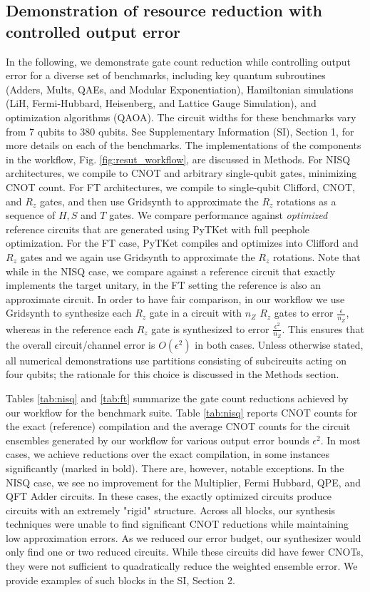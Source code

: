 \subsection*{Demonstration of resource reduction with controlled output error}
\label{sec:demos}
In the following, we demonstrate gate count reduction while controlling output error for a diverse set of benchmarks, including key quantum subroutines (Adders, Mults, QAEs, and Modular Exponentiation), Hamiltonian simulations (LiH, Fermi-Hubbard, Heisenberg, and Lattice Gauge Simulation), and optimization algorithms (QAOA). The circuit widths for these benchmarks vary from 7 qubits to 380 qubits. See Supplementary Information (SI), Section 1, for more details on each of the benchmarks. The implementations of the components in the workflow, Fig. \ref{fig:resut_workflow}, are discussed in Methods. 
For NISQ architectures, we compile to CNOT and arbitrary single-qubit gates, minimizing CNOT count. For FT architectures, we compile to single-qubit Clifford, CNOT, and $R_z$ gates, and then use Gridsynth \cite{ross_sellinger} to approximate the $R_z$ rotations as a sequence of $H, S$ and $T$ gates. We compare performance against \emph{optimized} reference circuits that are generated using PyTKet \cite{tket} with full peephole optimization. For the FT case, PyTKet compiles and optimizes into Clifford and $R_z$ gates and we again use Gridsynth to approximate the $R_z$ rotations. Note that while in the NISQ case, we compare against a reference circuit that exactly implements the target unitary, in the FT setting the reference is also an approximate circuit. In order to have fair comparison, in our workflow we use Gridsynth to synthesize each $R_z$ gate in a circuit with $n_Z$ $R_z$ gates to error $\frac{\epsilon}{n_Z}$, whereas in the reference each $R_z$ gate is synthesized to error $\frac{\epsilon^2}{n_Z}$. This ensures that the overall circuit/channel error is $O(\epsilon^2)$ in both cases. Unless otherwise stated, all numerical demonstrations use partitions consisting of subcircuits acting on four qubits; the rationale for this choice is discussed in the Methods section.

Tables \ref{tab:nisq} and \ref{tab:ft} summarize the gate count reductions achieved by our workflow for the benchmark suite.  
Table \ref{tab:nisq} reports CNOT counts for the exact (reference) compilation and the average CNOT counts for the circuit ensembles generated by our workflow for various output error bounds $\epsilon^2$.  
In most cases, we achieve reductions over the exact compilation, in some instances significantly (marked in bold). There are, however, notable exceptions. In the NISQ case, we see no improvement for the Multiplier, Fermi Hubbard, QPE, and QFT Adder circuits. In these cases, the exactly optimized circuits produce circuits with an extremely "rigid" structure. Across all blocks, our synthesis techniques were unable to find significant CNOT reductions while maintaining low approximation errors. As we reduced our error budget, our synthesizer would only find one or two reduced circuits. While these circuits did have fewer CNOTs, they were not sufficient to quadratically reduce the weighted ensemble error. We provide examples of such blocks in the SI, Section 2. 


